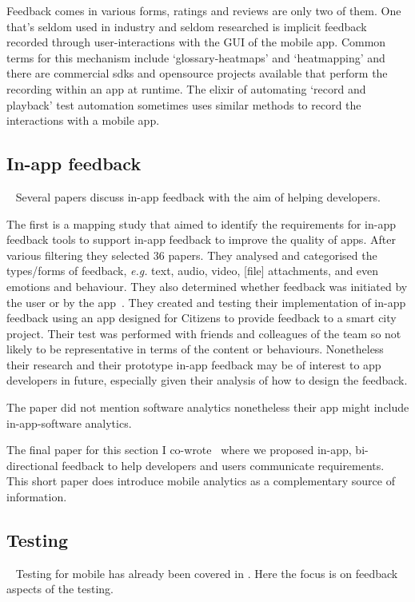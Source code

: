 Feedback comes in various forms, ratings and reviews are only two of them.  One that's seldom used in industry and seldom researched is implicit feedback recorded through user-interactions with the GUI of the mobile app. Common terms for this mechanism include `\glspl{glossary-heatmap}' and `heatmapping' and there are commercial \Glspl{sdk} and opensource projects available that perform the recording within an app at runtime. The elixir of automating `record and playback' test automation sometimes uses similar methods to record the interactions with a mobile app. 

\subsection{In-app feedback}~\label{rw-in-app-feedback-topic}
Several papers discuss in-app feedback with the aim of helping developers. 

The first is a mapping study that aimed to identify the requirements for in-app feedback tools to support in-app feedback to improve the quality of apps. After various filtering they selected 36 papers. They analysed and categorised the types/forms of feedback, \emph{e.g.} text, audio, video, [file] attachments, and even emotions and behaviour. They also determined whether feedback was initiated by the user or by the app~. 
They created and testing their implementation of in-app feedback using an app designed for Citizens to provide feedback to a smart city project. Their test was performed with friends and colleagues of the team so not likely to be representative in terms of the content or behaviours. Nonetheless their research and their prototype in-app feedback may be of interest to app developers in future, especially given their analysis of how to design the feedback. 

The paper did not mention software analytics nonetheless their app might include in-app-software analytics.

The final paper for this section I co-wrote~ where we proposed in-app, bi-directional feedback to help developers and users communicate requirements. This short paper does introduce mobile analytics as a complementary source of information. 


\subsection{Testing}~\label{rw-testing-topic}
Testing for mobile has already been covered in . Here the focus is on feedback aspects of the testing.

